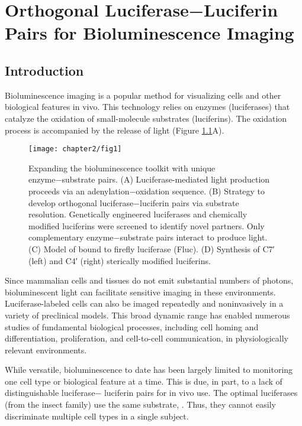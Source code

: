 
\chapter{Orthogonal Luciferase−Luciferin Pairs for Bioluminescence Imaging}
\section{Introduction}
Bioluminescence imaging is a popular method for visualizing
cells and other biological features in vivo.\cite{RN26} This technology
relies on enzymes (luciferases) that catalyze the oxidation of
small-molecule substrates (luciferins). The oxidation process is
accompanied by the release of light (Figure \ref{fig:overview}A).
\begin{figure}[htbp]
\texttt{[image: chapter2/fig1]}
\centering
\caption[Expanding the bioluminescence toolkit with unique
enzyme−substrate pairs]{Expanding the bioluminescence toolkit with unique
enzyme−substrate pairs. (A) Luciferase-mediated light production
proceeds via an adenylation−oxidation sequence. (B) Strategy to
develop orthogonal luciferase−luciferin pairs via substrate resolution.
Genetically engineered luciferases and chemically modified luciferins
were screened to identify novel partners. Only complementary
enzyme−substrate pairs interact to produce light. (C) Model of \dluciferin{}
bound to firefly luciferase (Fluc). (D) Synthesis of C7′ (left)
and C4′ (right) sterically modified luciferins.}
  \label{fig:overview}
\end{figure}
Since
mammalian cells and tissues do not emit substantial numbers
of photons, bioluminescent light can facilitate sensitive imaging
in these environments.\cite{Prescher:2010dv} Luciferase-labeled cells can also be
imaged repeatedly and noninvasively in a variety of preclinical
models. This broad dynamic range has enabled numerous
studies of fundamental biological processes, including cell
homing and differentiation, proliferation, and cell-to-cell
communication, in physiologically relevant environments.\cite{Badr:2011if}
\par
While versatile, bioluminescence to date has been largely
limited to monitoring one cell type or biological feature at a
time. This is due, in part, to a lack of distinguishable luciferase−
luciferin pairs for in vivo use. The optimal luciferases (from the
insect family) use the same substrate, \dluciferin{}.\cite{RN26,RN101} Thus, they
cannot easily discriminate multiple cell types in a single subject.
